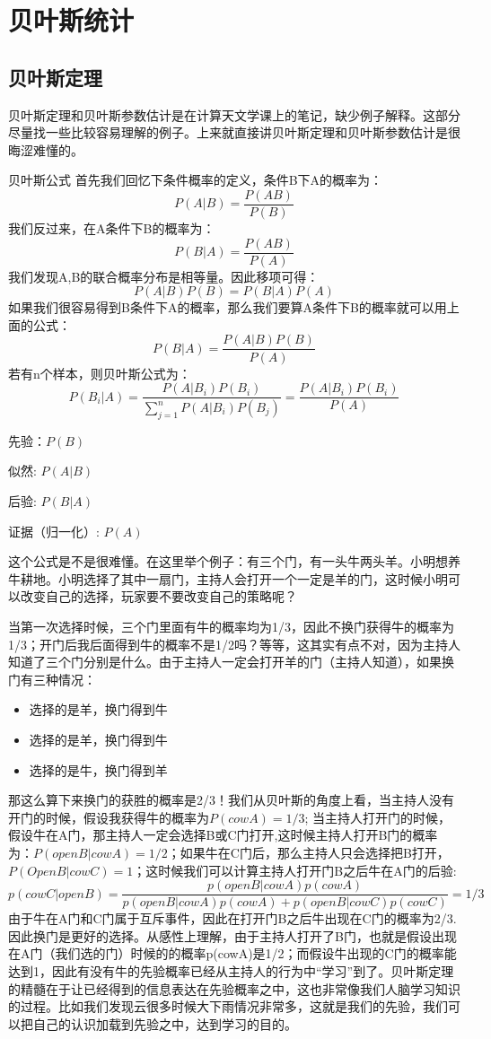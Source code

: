 \chapter{贝叶斯统计}
\section{贝叶斯定理}
贝叶斯定理和贝叶斯参数估计是在计算天文学课上的笔记，缺少例子解释。这部分尽量找一些比较容易理解的例子。上来就直接讲贝叶斯定理和贝叶斯参数估计是很晦涩难懂的。

贝叶斯公式
首先我们回忆下条件概率的定义，条件B下A的概率为：$$ P(A|B)=\frac{P(AB)}{P(B)} $$我们反过来，在A条件下B的概率为：$$P(B|A)=\frac{P(AB)}{P(A)}$$
我们发现A,B的联合概率分布是相等量。因此移项可得：
$$P(A|B)P(B)=P(B|A)P(A)$$
如果我们很容易得到B条件下A的概率，那么我们要算A条件下B的概率就可以用上面的公式：
$$P(B|A)=\frac{P(A|B)P(B)}{P(A)}$$
若有n个样本，则贝叶斯公式为：
\begin{equation}
    P(B_i|A)=\frac{P(A|B_i)P(B_i)}{\sum_{j=1}^{n}P(A|B_i)P(B_j)}
    =\frac{P(A|B_i)P(B_i)}{P(A)}
\end{equation}

先验：$P(B)$

似然:  $P(A|B)$

后验:  $P(B|A)$

证据（归一化）:  $P(A)$

这个公式是不是很难懂。在这里举个例子：有三个门，有一头牛两头羊。小明想养牛耕地。小明选择了其中一扇门，主持人会打开一个一定是羊的门，这时候小明可以改变自己的选择，玩家要不要改变自己的策略呢？

当第一次选择时候，三个门里面有牛的概率均为1/3，因此不换门获得牛的概率为1/3；开门后我后面得到牛的概率不是1/2吗？等等，这其实有点不对，因为主持人知道了三个门分别是什么。由于主持人一定会打开羊的门（主持人知道），如果换门有三种情况：
\begin{itemize}
    \item 选择的是羊，换门得到牛
    \item 选择的是羊，换门得到牛
    \item 选择的是牛，换门得到羊
\end{itemize}
那这么算下来换门的获胜的概率是2/3！我们从贝叶斯的角度上看，当主持人没有开门的时候，假设我获得牛的概率为$P(cowA)=1/3$; 当主持人打开门的时候，假设牛在A门，那主持人一定会选择B或C门打开,这时候主持人打开B门的概率为：$P(openB|cowA)=1/2$；如果牛在C门后，那么主持人只会选择把B打开，$P(OpenB|cowC)=1$；这时候我们可以计算主持人打开门B之后牛在A门的后验:
$$ p(cowC|openB) = \frac{p(openB|cowA)p(cowA)}{p(openB|cowA)p(cowA)+p(openB|cowC)p(cowC)}=1/3 $$
由于牛在A门和C门属于互斥事件，因此在打开门B之后牛出现在C门的概率为2/3.因此换门是更好的选择。从感性上理解，由于主持人打开了B门，也就是假设出现在A门（我们选的门）时候的的概率p(cowA)是1/2；而假设牛出现的C门的概率能达到1，因此有没有牛的先验概率已经从主持人的行为中“学习”到了。贝叶斯定理的精髓在于让已经得到的信息表达在先验概率之中，这也非常像我们人脑学习知识的过程。比如我们发现云很多时候大下雨情况非常多，这就是我们的先验，我们可以把自己的认识加载到先验之中，达到学习的目的。

